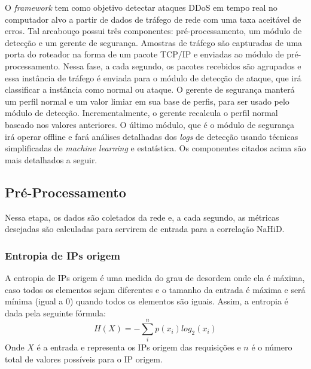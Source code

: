O \textit{framework} tem como objetivo detectar ataques DDoS em tempo real no computador alvo a partir de dados de tráfego de rede com uma taxa aceitável de erros. Tal arcabouço possui três componentes: pré-processamento, um módulo de detecção e um gerente de segurança. Amostras de tráfego são capturadas de uma porta do roteador na forma de um pacote TCP/IP e enviadas ao módulo de pré-processamento. Nessa fase, a cada segundo, os pacotes recebidos são agrupados e essa instância de tráfego é enviada para o módulo de detecção de ataque, que irá classificar a instância como normal ou ataque. O gerente de segurança manterá um perfil normal e um valor limiar em sua base de perfis, para ser usado pelo módulo de detecção. Incrementalmente, o gerente recalcula o perfil normal baseado nos valores anteriores. O último módulo, que é o módulo de segurança irá operar offline e fará análises detalhadas dos \textit{logs} de detecção usando técnicas simplificadas de \textit{machine learning} e estatística. Os componentes citados acima são mais detalhados a seguir.
\subsection{Pré-Processamento}
Nessa etapa, os dados são coletados da rede e, a cada segundo, as métricas desejadas são calculadas para servirem de entrada para a correlação NaHiD. 
\subsubsection{Entropia de IPs origem}
A entropia de IPs origem é uma medida do grau de desordem onde ela é máxima, caso todos os elementos sejam diferentes e o tamanho da entrada é máxima e será mínima (igual a 0) quando todos os elementos são iguais. Assim, a entropia é dada pela seguinte fórmula:
\begin{equation}
H(X) = - \sum_{i}^{n}p(x_i)log_2(x_i)
\end{equation}
Onde $X$ é a entrada e representa os IPs origem das requisições e $n$ é o número total de valores possíveis para o IP origem.  
